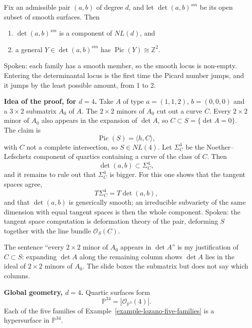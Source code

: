 \begin{theorem}
\label{theorem-lvl-nl-component}
Fix an admissible pair $(a,b)$ of degree
$d$, and let
$\operatorname{det}(a,b)^{sm}$ be its open
subset of smooth surfaces. Then
\begin{enumerate}
\item $\operatorname{det}(a,b)^{sm}$ is a
component of $NL(d)$, and
\item a general $Y \in
\operatorname{det}(a,b)^{sm}$ has
$\operatorname{Pic}(Y) \cong \mathbb{Z}^2$.
\end{enumerate}
\end{theorem}

Spoken: each family has a smooth member, so
the smooth locus is non-empty. Entering the
determinantal locus is the first time the
Picard number jumps, and it jumps by the
least possible amount, from 1 to 2.

\medskip\noindent
{\bf Idea of the proof, for $d = 4$.} Take
$A$ of type
$a = (1,1,2)$, $b = (0,0,0)$ and a
$3 \times 2$ submatrix $A_0$ of $A$. The
$2 \times 2$ minors of $A_0$ cut out a curve
$C$. Every $2 \times 2$ minor of $A_0$ also
appears in the expansion of $\det A$, so $C
\subset S = \{ \det A = 0 \}$. The claim is
$$
\operatorname{Pic}(S) = \langle h, C
\rangle,
$$
with $C$ not a complete intersection, so
$S \in NL(4)$. Let $\Sigma^4_C$ be the
Noether--Lefschetz component of quartics
containing a curve of the class of $C$.
Then
$$
\operatorname{det}(a,b) \subset
\Sigma^4_C,
$$
and it remains to rule out that
$\Sigma^4_C$ is bigger. For this one shows
that the tangent spaces agree,
$$
T\Sigma^4_C = T\operatorname{det}(a,b),
$$
and that $\operatorname{det}(a,b)$ is
generically smooth; an irreducible
subvariety of the same dimension with equal
tangent spaces is then the whole component.
Spoken: the tangent space computation is
deformation theory of the pair, deforming
$S$ together with the line bundle
$\mathcal{O}_S(C)$.

\begin{remark}
\label{remark-lozano-minors}
The sentence ``every $2 \times 2$ minor of
$A_0$ appears in $\det A$'' is my
justification of $C \subset S$: expanding
$\det A$ along the remaining column shows
$\det A$ lies in the ideal of $2 \times 2$
minors of $A_0$. The slide boxes the
submatrix but does not say which columns.
\end{remark}

\medskip\noindent
{\bf Global geometry, $d = 4$.} Quartic
surfaces form
$$
\mathbb{P}^{34} = |\mathcal{O}_{\mathbb{P}^3}
(4)|.
$$
Each of the five families of
Example~\ref{example-lozano-five-families}
is a hypersurface in $\mathbb{P}^{34}$.

